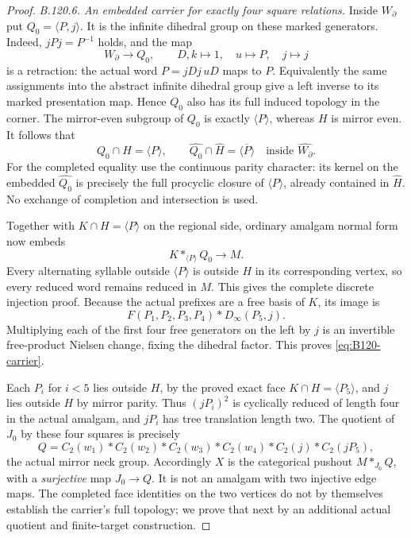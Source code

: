 \begin{proof}
\emph{B.120.6. An embedded carrier for exactly four square relations.}
Inside $W_{\partial}$ put $Q_0=\langle P,j\rangle$.
It is the infinite dihedral group on these marked generators.
Indeed, $jPj=P^{-1}$ holds, and the map
\[
 W_{\partial}\longrightarrow Q_0,\qquad
 D,k\longmapsto1,\quad u\longmapsto P,\quad j\longmapsto j
\]
is a retraction: the actual word $P=jDj\,uD$ maps to $P$.
Equivalently the same assignments into the abstract infinite
dihedral group give a left inverse to its marked presentation
map. Hence $Q_0$ also has its full induced topology in the corner.
The mirror-even subgroup of $Q_0$ is exactly $\langle P\rangle$,
whereas $H$ is mirror even. It follows that
\begin{equation}\label{eq:B120-corner-face}
 Q_0\cap H=\langle P\rangle,\qquad
 \widehat{Q_0}\cap\widehat H=\overline{\langle P\rangle}
       \quad\text{inside }\widehat{W_{\partial}}.
\end{equation}
For the completed equality use the continuous parity character:
its kernel on the embedded $\widehat{Q_0}$ is precisely the full
procyclic closure of $\langle P\rangle$, already contained in
$\widehat H$. No exchange of completion and intersection is used.

Together with $K\cap H=\langle P\rangle$ on the regional side,
ordinary amalgam normal form now embeds
\begin{equation}\label{eq:B120-carrier-amalgam}
 K*_{\langle P\rangle}Q_0\longrightarrow M.
\end{equation}
Every alternating syllable outside $\langle P\rangle$ is outside
$H$ in its corresponding vertex, so every reduced word remains
reduced in $M$. This gives the complete discrete injection proof.
Because the actual prefixes are a free basis of $K$, its image is
\[
 F(P_1,P_2,P_3,P_4)*D_{\infty}(P_5,j).
\]
Multiplying each of the first four free generators on the left
by $j$ is an invertible free-product Nielsen change, fixing the
dihedral factor. This proves \eqref{eq:B120-carrier}.

Each $P_i$ for $i<5$ lies outside $H$, by the proved exact face
$K\cap H=\langle P_5\rangle$, and $j$ lies outside $H$ by
mirror parity. Thus $(jP_i)^2$ is cyclically reduced of length
four in the actual amalgam, and $jP_i$ has tree translation length
two. The quotient of $J_0$ by these four squares is precisely
\[
 Q=C_2(w_1)*C_2(w_2)*C_2(w_3)*C_2(w_4)*C_2(j)*C_2(jP_5),
\]
the actual mirror neck group. Accordingly $X$ is the categorical
pushout $M*_{J_0}Q$, with a \emph{surjective} map $J_0\to Q$.
It is not an amalgam with two injective edge maps. The completed
face identities on the two vertices do not by themselves establish
the carrier's full topology; we prove that next by an additional
actual quotient and finite-target construction.


\end{proof}
